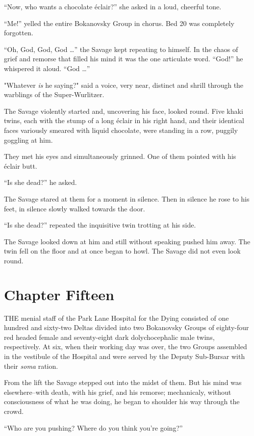 \documentclass[12pt]{report}
\newcommand{\mychapter}[2]{
\setcounter{chapter}{#1}
    \setcounter{section}{0}
    \chapter*{#2}
    \addcontentsline{toc}{chapter}{#2}
}
\begin{document}
``Now, who wants a chocolate éclair?'' she asked in a loud, cheerful
tone.

``Me!'' yelled the entire Bokanovsky Group in chorus. Bed 20 was
completely forgotten.

``Oh, God, God, God \ldots{}'' the Savage kept repeating to himself. In
the chaos of grief and remorse that filled his mind it was the one
articulate word. ``God!'' he whispered it aloud. ``God \ldots{}''

"Whatever \emph{is} he saying?" said a voice, very near, distinct and
shrill through the warblings of the Super-Wurlitzer.

The Savage violently started and, uncovering his face, looked round.
Five khaki twins, each with the stump of a long éclair in his right
hand, and their identical faces variously smeared with liquid chocolate,
were standing in a row, puggily goggling at him.

They met his eyes and simultaneously grinned. One of them pointed with
his éclair butt.

``Is she dead?'' he asked.

The Savage stared at them for a moment in silence. Then in silence he
rose to his feet, in silence slowly walked towards the door.

``Is she dead?'' repeated the inquisitive twin trotting at his side.

The Savage looked down at him and still without speaking pushed him
away. The twin fell on the floor and at once began to howl. The Savage
did not even look round.

\mychapter{15}{Chapter Fifteen}
THE menial staff of the Park Lane Hospital for the Dying consisted of
one hundred and sixty-two Deltas divided into two Bokanovsky Groups of
eighty-four red headed female and seventy-eight dark dolychocephalic
male twins, respectively. At six, when their working day was over, the
two Groups assembled in the vestibule of the Hospital and were served by
the Deputy Sub-Bursar with their \emph{soma} ration.

From the lift the Savage stepped out into the midst of them. But his
mind was elsewhere--with death, with his grief, and his remorse;
mechanicaly, without consciousness of what he was doing, he began to
shoulder his way through the crowd.

``Who are you pushing? Where do you think you're going?''
\end{document}
